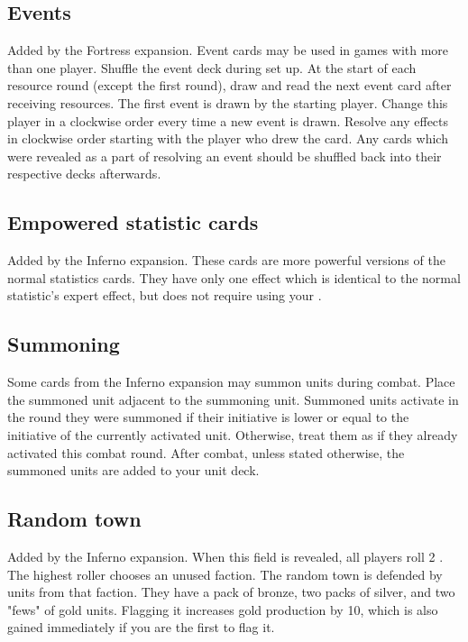 \subsection*{Events}
Added by the Fortress expansion.
Event cards may be used in games with more than one player.
Shuffle the event deck during set up.
At the start of each resource round (except the first round), draw and read the next event card after receiving resources.
The first event is drawn by the starting player.
Change this player in a clockwise order every time a new event is drawn.
Resolve any effects in clockwise order starting with the player who drew the card.
Any cards which were revealed as a part of resolving an event should be shuffled back into their respective decks afterwards.
\subsection*{Empowered statistic cards}
Added by the Inferno expansion.
These cards are more powerful versions of the normal statistics cards.
They have only one effect which is identical to the normal statistic's expert effect, but does not require using your .

\subsection*{Summoning}
Some cards from the Inferno expansion may summon units during combat.
Place the summoned unit adjacent to the summoning unit.
Summoned units activate in the round they were summoned if their initiative is lower or equal to the initiative of the currently activated unit.
Otherwise, treat them as if they already activated this combat round.
After combat, unless stated otherwise, the summoned units are added to your unit deck.
\subsection*{Random town}
Added by the Inferno expansion.
When this field is revealed, all players roll 2 .
The highest roller chooses an unused faction.
The random town is defended by units from that faction.
They have a pack of bronze, two packs of silver, and two "fews" of gold units.
Flagging it increases gold production by 10, which is also gained immediately if you are the first to flag it.
